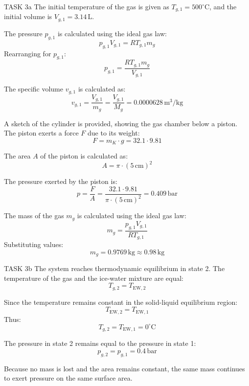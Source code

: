 TASK 3a  
The initial temperature of the gas is given as \( T_{g,1} = 500^\circ\text{C} \), and the initial volume is \( V_{g,1} = 3.14 \, \text{L} \).  

The pressure \( p_{g,1} \) is calculated using the ideal gas law:  
\[
p_{g,1} V_{g,1} = R T_{g,1} m_g
\]  
Rearranging for \( p_{g,1} \):  
\[
p_{g,1} = \frac{R T_{g,1} m_g}{V_{g,1}}
\]  

The specific volume \( v_{g,1} \) is calculated as:  
\[
v_{g,1} = \frac{V_{g,1}}{m_g} = \frac{V_{g,1}}{M_g} = 0.0000628 \, \text{m}^3/\text{kg}
\]  

A sketch of the cylinder is provided, showing the gas chamber below a piston. The piston exerts a force \( F \) due to its weight:  
\[
F = m_K \cdot g = 32.1 \cdot 9.81
\]  

The area \( A \) of the piston is calculated as:  
\[
A = \pi \cdot (5 \, \text{cm})^2
\]  

The pressure exerted by the piston is:  
\[
p = \frac{F}{A} = \frac{32.1 \cdot 9.81}{\pi \cdot (5 \, \text{cm})^2} = 0.409 \, \text{bar}
\]  

The mass of the gas \( m_g \) is calculated using the ideal gas law:  
\[
m_g = \frac{p_{g,1} V_{g,1}}{R T_{g,1}}
\]  
Substituting values:  
\[
m_g = 0.9769 \, \text{kg} \approx 0.98 \, \text{kg}
\]  

TASK 3b  
The system reaches thermodynamic equilibrium in state 2. The temperature of the gas and the ice-water mixture are equal:  
\[
T_{g,2} = T_{\text{EW},2}
\]  

Since the temperature remains constant in the solid-liquid equilibrium region:  
\[
T_{\text{EW},2} = T_{\text{EW},1}
\]  
Thus:  
\[
T_{g,2} = T_{\text{EW},1} = 0^\circ\text{C}
\]  

The pressure in state 2 remains equal to the pressure in state 1:  
\[
p_{g,2} = p_{g,1} = 0.4 \, \text{bar}
\]  

Because no mass is lost and the area remains constant, the same mass continues to exert pressure on the same surface area.